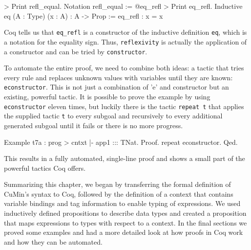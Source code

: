 \documentclass[paper = a4, fleqn, abstract=on, twoside]{scrreprt}
\newcommand{\coqinline}[1]{\texttt{#1}}
\begin{document}
\begin{coqcode}
> Print refl_equal.
Notation refl_equal := @eq_refl
> Print eq_refl.
Inductive eq (A : Type) (x : A) : A -> Prop :=  eq_refl : x = x
\end{coqcode}
Coq tells us that \texttt{eq\_refl} is a constructor of the inductive definition \texttt{eq}, which is a notation for the equality sign. Thus, \texttt{reflexivity} is actually the application of a constructor and can be tried by \texttt{constructor}.\\ 
\par \noindent
To automate the entire proof, we need to combine both ideas: a tactic that tries every rule and replaces unknown values with variables until they are known: \coqinline{econstructor}. This is not just a combination of 'e' and constructor but an existing, powerful tactic. It is possible to prove the example by using \coqinline{econstructor} eleven times, but luckily there is the tactic \coqinline{repeat t} that applies the supplied tactic \coqinline{t} to every subgoal and recursively to every additional generated subgoal until it fails or there is no more progress.
\begin{coqcode}
Example t7a : prog > cntxt |- app1 ::: TNat.
Proof.
  repeat econstructor.
Qed.
\end{coqcode}
This results in a fully automated, single-line proof and shows a small part of the powerful tactics Coq offers.\\
\par \noindent
Summarizing this chapter, we began by transferring the formal definition of CuMin's syntax to Coq, followed by the definition of a context that contains variable bindings and tag information to enable typing of expressions. We used inductively defined propositions to describe data types and created a proposition that maps expressions to types with respect to a context. In the final sections we proved some examples and had a more detailed look at how proofs in Coq work and how they can be automated.
\end{document}
